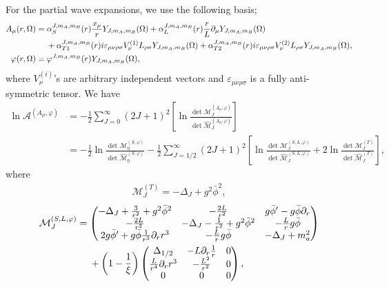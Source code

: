 \documentclass[12pt]{article}
\begin{document}
For the partial wave expansions, we use the following basis;
\begin{align}
 A_\mu(r,\Omega)
  & = \alpha_S^{J,m_A,m_B}(r)\frac{x_\mu}{r} Y_{J,m_A,m_B}(\Omega)
 +\alpha_L^{J,m_A,m_B}(r)\frac{r}{L}\partial_\mu Y_{J,m_A,m_B}(\Omega)\nonumber \\
  & \hspace{3ex}+\alpha_{T1}^{J,m_A,m_B}(r)i\varepsilon_{\mu\nu\rho\sigma}
 V_\nu^{(1)}L_{\rho\sigma}Y_{J,m_A,m_B}(\Omega)
 +\alpha_{T2}^{J,m_A,m_B}(r)i\varepsilon_{\mu\nu\rho\sigma}
 V_\nu^{(2)}L_{\rho\sigma}Y_{J,m_A,m_B}(\Omega),                                \\
 \varphi(r,\Omega)
  & = \varphi^{J,m_A,m_B}(r)Y_{J,m_A,m_B}(\Omega),
 \label{eq_gaugeBasis}
\end{align}
where $V_\nu^{(i)}$'s are arbitrary independent vectors and
$\varepsilon_{\mu\nu\rho\sigma}$ is a fully anti-symmetric tensor.  We
have
\begin{align}
 \ln\mathcal A^{(A_\mu,\varphi)}
 &= -\frac{1}{2}\sum_{J = 0}^{\infty}(2J+1)^2
 \left[
  \ln\frac{\det\mathcal M^{(A_\mu,\varphi)}_J}{\det\widehat{\mathcal M}^{(A_\mu,\varphi)}_J}
 \right]\nonumber \\
 &= -\frac{1}{2}\ln\frac{\det\mathcal M^{(S,\varphi)}_0}{\det\widehat{\mathcal M}^{(S,\varphi)}_0}
 -\frac{1}{2}\sum_{J = 1/2}^{\infty}(2J+1)^2
 \left[
  \ln\frac{\det\mathcal M^{(S,L,\varphi)}_J}{\det\widehat{\mathcal M}^{(S,L,\varphi)}_J}
  +2\ln\frac{\det\mathcal M^{(T)}_J}{\det\widehat{\mathcal M}^{(T)}_J}
 \right],
 \label{eq_gaugeSLT}
\end{align}
where
\begin{align}
 \mathcal M^{(T)}_J = -\Delta_J+g^2\bar\phi^2,
\end{align}
\begin{align}
 \mathcal M^{(S,L,\varphi)}_J & =
 \begin{pmatrix}
  -\Delta_J+\frac{3}{r^2}+g^2\bar\phi^2
   & -\frac{2L}{r^2}
   & g\bar\phi'-g\bar\phi\partial_r                                  \\
  -\frac{2L}{r^2}
   & -\Delta_J-\frac{1}{r^2}+g^2\bar\phi^2 & -\frac{L}{r}g\bar\phi \\
  2g\bar\phi'+g\bar\phi\frac{1}{r^3}\partial_rr^3
   & -\frac{L}{r}g\bar\phi
   & -\Delta_J+m_a^2
 \end{pmatrix}\nonumber                                     \\
                              & \hspace{3ex}+\left(1-\frac{1}{\xi}\right)
 \begin{pmatrix}
  \Delta_{1/2}
   & -L\partial_r\frac{1}{r}
   & 0                       \\
  \frac{L}{r^4}\partial_rr^3
   & -\frac{L^2}{r^2}
   & 0                       \\
  0
   & 0
   & 0
 \end{pmatrix},
\end{align}
\end{document}

